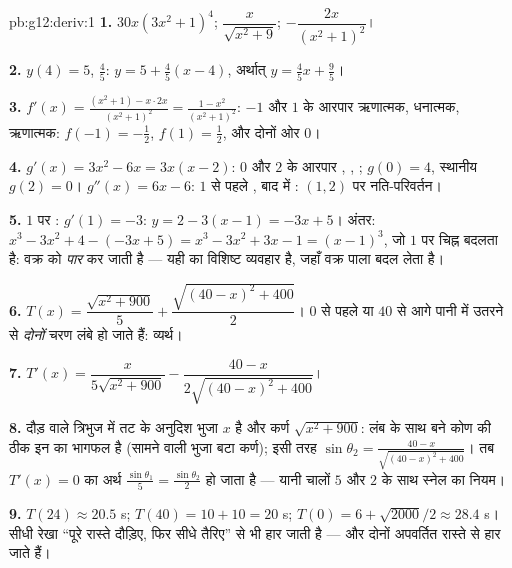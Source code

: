 \begin{solution}{pb:g12:deriv:1}
\textbf{1.} $30x\left(3x^2 + 1\right)^4$; \quad $\dfrac{x}{\sqrt{x^2 + 9}}$; \quad $-\dfrac{2x}{\left(x^2 + 1\right)^2}$।

\textbf{2.} $y(4) = 5$,  $\frac45$:  $y = 5 + \frac45(x - 4)$, अर्थात् $y = \frac45 x + \frac95$।

\textbf{3.} $f'(x) = \frac{(x^2 + 1) - x \cdot 2x}{(x^2+1)^2}
= \frac{1 - x^2}{(x^2 + 1)^2}$: $-1$ और $1$ के आरपार ऋणात्मक, धनात्मक, ऋणात्मक:
 $f(-1) = -\frac12$,  $f(1) = \frac12$, और दोनों ओर  $0$।

\textbf{4.} $g'(x) = 3x^2 - 6x = 3x(x - 2)$: $0$ और $2$ के आरपार , , ;
 $g(0) = 4$, स्थानीय  $g(2) = 0$। $g''(x) = 6x - 6$: $1$ से पहले , बाद
में : $(1, 2)$ पर नति-परिवर्तन।

\textbf{5.} $1$ पर :  $g'(1) = -3$: $y = 2 - 3(x - 1) = -3x + 5$। अंतर: $x^3 - 3x^2 + 4 - (-3x + 5) = x^3 - 3x^2 + 3x - 1 =
(x - 1)^3$, जो $1$
पर चिह्न बदलता है:  वक्र को \emph{पार} कर जाती है --- यही
 का विशिष्ट व्यवहार है, जहाँ वक्र पाला बदल लेता है।

\textbf{6.} $T(x) = \dfrac{\sqrt{x^2 + 900}}{5} +
\dfrac{\sqrt{(40 - x)^2 + 400}}{2}$। $0$ से पहले या $40$ से आगे पानी में उतरने से \emph{दोनों}
चरण लंबे हो जाते हैं: व्यर्थ।

\textbf{7.} $T'(x) = \dfrac{x}{5\sqrt{x^2 + 900}} -
\dfrac{40 - x}{2\sqrt{(40 - x)^2 + 400}}$।

\textbf{8.} दौड़ वाले त्रिभुज में तट के अनुदिश भुजा $x$ है और कर्ण $\sqrt{x^2 + 900}$:
लंब के साथ बने कोण की  ठीक इन का भागफल है (सामने वाली भुजा बटा कर्ण);
इसी तरह $\sin\theta_2 = \frac{40 - x}{\sqrt{(40-x)^2 + 400}}$। तब $T'(x) = 0$ का अर्थ $\frac{\sin\theta_1}{5} = \frac{\sin\theta_2}{2}$ हो जाता है --- यानी चालों $5$ और
$2$ के साथ स्नेल का नियम।

\textbf{9.} $T(24) \approx 20.5$ s; $T(40) = 10 + 10 = 20$ s; $T(0) = 6 + \sqrt{2000}/2 \approx 28.4$ s। सीधी रेखा ``पूरे रास्ते दौड़िए, फिर
सीधे तैरिए'' से भी हार जाती है --- और दोनों अपवर्तित रास्ते से हार जाते हैं।


\end{solution}
